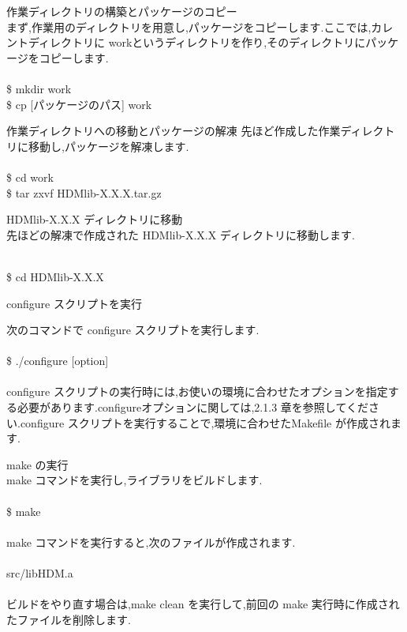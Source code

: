 \documentclass[twoside]{jbook}
\begin{document}
\begin{enumerate}
\item 作業ディレクトリの構築とパッケージのコピー\\
まず,作業用のディレクトリを用意し,パッケージをコピーします.ここでは,カレントディレクトリに workというディレクトリを作り,そのディレクトリにパッケージをコピーします.\\\\
{\sf
\$ mkdir work \\
\$ cp [パッケージのパス] work \\
}
\item 作業ディレクトリへの移動とパッケージの解凍
先ほど作成した作業ディレクトリに移動し,パッケージを解凍します.\\\\
{\sf
\$ cd work \\
\$ tar zxvf HDMlib-X.X.X.tar.gz \\
}
\item HDMlib-X.X.X ディレクトリに移動\\
先ほどの解凍で作成された HDMlib-X.X.X ディレクトリに移動します.\\\\
{\sf
\$ cd HDMlib-X.X.X \\
\item configure スクリプトを実行 \\
}
次のコマンドで configure スクリプトを実行します.\\\\
{\sf
\$ ./configure [option] \\\\
}
configure スクリプトの実行時には,お使いの環境に合わせたオプションを指定する必要があります.configureオプションに関しては,2.1.3 章を参照してください.configure スクリプトを実行することで,環境に合わせたMakefile が作成されます.\\
\item make の実行\\
make コマンドを実行し,ライブラリをビルドします.\\\\
{\sf
\$ make\\\\
}
make コマンドを実行すると,次のファイルが作成されます.\\\\
{\sf
src/libHDM.a\\\\
}
ビルドをやり直す場合は,make clean を実行して,前回の make 実行時に作成されたファイルを削除します.\\\\

\end{enumerate}
\end{document}
